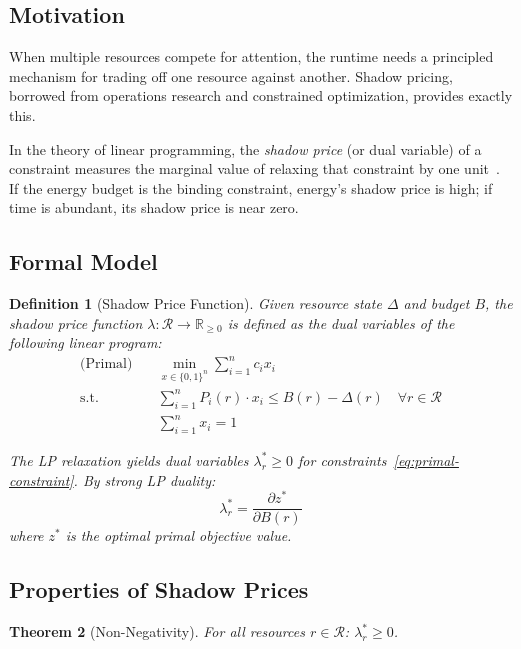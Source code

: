 \documentclass[11pt,a4paper]{article}
\newtheorem{theorem}{Theorem}[section]
\newtheorem{definition}[theorem]{Definition}
\begin{document}
\subsection{Motivation}

When multiple resources compete for attention, the runtime needs a principled
mechanism for trading off one resource against another.  Shadow pricing,
borrowed from operations research and constrained optimization, provides exactly
this.

In the theory of linear programming, the \emph{shadow price} (or dual variable)
of a constraint measures the marginal value of relaxing that constraint by one
unit~\cite{bertsimas1997}.  If the energy budget is the binding constraint,
energy's shadow price is high; if time is abundant, its shadow price is near
zero.

\subsection{Formal Model}

\begin{definition}[Shadow Price Function]
\label{def:shadow-price}
Given resource state $\Delta$ and budget $B$, the shadow price function
$\lambda : \mathcal{R} \to \mathbb{R}_{\geq 0}$ is defined as the dual
variables of the following linear program:
\begin{align}
  \text{(Primal)} \quad & \min_{x \in \{0,1\}^n} \sum_{i=1}^n c_i x_i
    \label{eq:primal} \\
  \text{s.t.} \quad & \sum_{i=1}^n P_i(r) \cdot x_i \leq B(r) - \Delta(r)
    \quad \forall r \in \mathcal{R} \label{eq:primal-constraint} \\
  & \sum_{i=1}^n x_i = 1 \label{eq:one-solution}
\end{align}

The LP relaxation yields dual variables $\lambda_r^* \geq 0$ for
constraints~\eqref{eq:primal-constraint}.  By strong LP duality:
\[
  \lambda_r^* = \frac{\partial z^*}{\partial B(r)}
\]
where $z^*$ is the optimal primal objective value.
\end{definition}

\subsection{Properties of Shadow Prices}

\begin{theorem}[Non-Negativity]
\label{thm:non-negative}
For all resources $r \in \mathcal{R}$: $\lambda_r^* \geq 0$.
\end{theorem}
\end{document}
